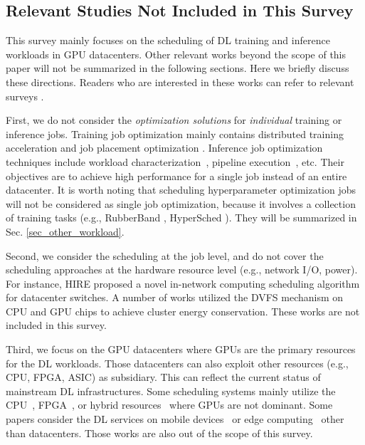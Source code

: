 \subsection{Relevant Studies Not Included in This Survey}






This survey mainly focuses on the scheduling of DL training and inference workloads in GPU datacenters. Other relevant works beyond the scope of this paper will not be summarized in the following sections. Here we briefly discuss these directions. Readers who are interested in these works can refer to relevant surveys \cite{SurveyDistDL, SurveyDML,SurveyPruneQuant, SurveyInfer21,SurveyCloudSched, SurveyCloudSched17,SurvHPC, SurveyHPCBigData}.







First, we do not consider the \textit{optimization solutions} for \textit{individual} training or inference jobs. Training job optimization mainly contains distributed training acceleration \cite{BytePS, Poseidon, LB-BSP} and job placement optimization \cite{HeteroG, Pack, OJPP}. Inference job optimization techniques include workload characterization~\cite{chahal2021performance}, pipeline execution~\cite{kang2020jointly}, etc. Their objectives are to achieve high performance for a single job instead of an entire datacenter.  It is worth noting that scheduling hyperparameter optimization jobs will not be considered as single job optimization, because it involves a collection of training tasks (e.g., RubberBand \cite{RubberBand}, HyperSched \cite{HyperSched}). They will be summarized in Sec. \ref{sec_other_workload}.

Second, we consider the scheduling at the job level, and do not cover the scheduling approaches at the hardware resource level (e.g., network I/O, power). For instance, HIRE \cite{HIRE} proposed a novel in-network computing scheduling algorithm for datacenter switches. A number of works \cite{DVFS-AWARE, mei2021energy, DVFS2020} utilized the DVFS mechanism on CPU and GPU chips to achieve cluster energy conservation. These works are not included in this survey.

Third, we focus on the GPU datacenters where GPUs are the primary resources for the DL workloads. Those datacenters can also exploit other resources (e.g., CPU, FPGA, ASIC) as subsidiary. This can reflect the current status of mainstream DL infrastructures. Some scheduling systems mainly utilize the CPU~\cite{yan2016SERF,Ishakian2018Serving,Bhattacharjee2019BARISTA,Gunasekaran2020Fifer}, FPGA~\cite{jiang2021MicroRec,hwang2020Centaur}, or hybrid resources~\cite{jiang2021FleetRec} where GPUs are not dominant. Some papers consider the DL services on mobile devices~\cite{Ogden2021PieSlicer} or edge computing~\cite{seo2021SLO_Aware,zhang2020QoS} other than datacenters. Those works are also out of the scope of this survey.



